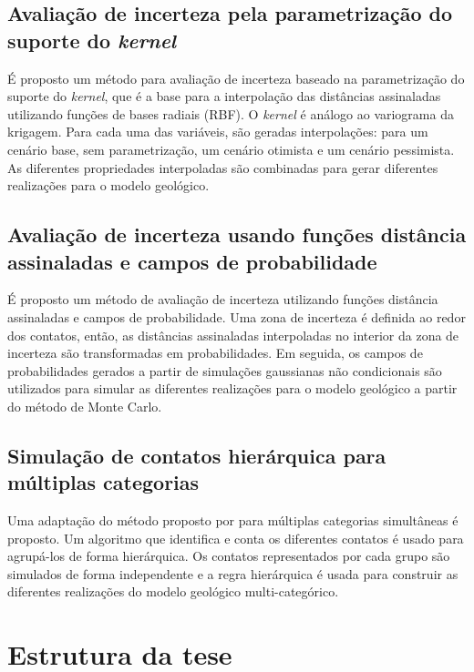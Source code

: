 \subsection{Avaliação de incerteza pela parametrização do suporte do \textit{kernel}}

É proposto um método para avaliação de incerteza baseado na parametrização do suporte do \textit{kernel}, que é a base para a interpolação das distâncias assinaladas utilizando funções de bases radiais (RBF). O \textit{kernel} é análogo ao variograma da krigagem. Para cada uma das variáveis, são geradas interpolações: para um cenário base, sem parametrização, um cenário otimista e um cenário pessimista. As diferentes propriedades interpoladas são combinadas para gerar diferentes realizações para o modelo geológico.  

\subsection{Avaliação de incerteza usando funções distância assinaladas e campos de probabilidade}

É proposto um método de avaliação de incerteza utilizando funções distância assinaladas e campos de probabilidade. Uma zona de incerteza é definida ao redor dos contatos, então, as distâncias assinaladas interpoladas no interior da zona de incerteza são transformadas em probabilidades. Em seguida, os campos de probabilidades gerados a partir de simulações gaussianas não condicionais são utilizados para simular as diferentes realizações para o modelo geológico a partir do método de Monte Carlo.

\subsection{Simulação de contatos hierárquica para múltiplas categorias}

Uma adaptação do método proposto por  para múltiplas categorias simultâneas é proposto. Um algoritmo que identifica e conta os diferentes contatos é usado para agrupá-los de forma hierárquica. Os contatos representados por cada grupo são simulados de forma independente e a regra hierárquica é usada para construir as diferentes realizações do modelo geológico multi-categórico. 

\section{Estrutura da tese}

